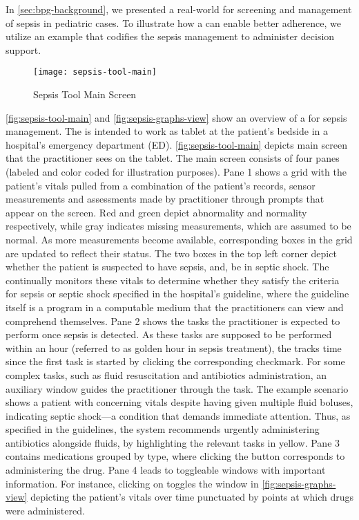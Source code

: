 In \autoref{sec:bpg-background}, we presented a real-world
\BPG{} for screening and management of sepsis in pediatric cases.
To illustrate how a \CDSSs{} can enable better \BPG{} adherence,
we utilize an example \CDSS{} that codifies the sepsis management \BPG{}
to administer decision support.

\begin{figure}[t!]
  \centering
  \texttt{[image: sepsis-tool-main]}
  \caption{Sepsis Tool Main Screen}\label{fig:sepsis-tool-main}
\end{figure}

\autoref{fig:sepsis-tool-main} and \autoref{fig:sepsis-graphs-view} show an overview
of a \CDSS{} for sepsis management.
The \CDSS{} is intended to work as tablet at
the patient's bedside in a hospital's emergency department (ED).
\autoref{fig:sepsis-tool-main} depicts main screen that the practitioner sees on the tablet.
The main screen consists of four panes (labeled and color coded for illustration
purposes). Pane 1 shows a grid with the patient's vitals pulled
from a combination of the patient's records, sensor measurements and
assessments made by practitioner through prompts that appear on the screen.
Red and green depict abnormality and normality respectively, while gray
indicates missing measurements, which are assumed to be normal. As more
measurements become available, corresponding boxes in the grid are updated
to reflect their status. The two boxes in the top left corner depict whether
the patient is suspected to have sepsis, and, be in septic shock. The \CDSS{}
continually monitors these vitals to determine whether they satisfy the criteria
for sepsis or septic shock specified in the hospital's guideline, where the
guideline itself is a program in a computable medium that the practitioners
can view and comprehend themselves. Pane 2 shows the tasks the practitioner is expected to perform
once sepsis is detected. As these tasks are supposed to be performed within an
hour (referred to as golden hour in sepsis treatment), the \CDSS{} tracks time
since the first task is started by clicking the corresponding checkmark.
For some complex tasks, such as fluid resuscitation and antibiotics
administration, an auxiliary window guides the practitioner through the task. The
example scenario shows a patient with concerning vitals despite having
given multiple fluid boluses, indicating septic shock---a condition that
demands immediate attention. Thus, as specified in the guidelines, the system
recommends urgently administering antibiotics alongside fluids, by highlighting
the relevant tasks in yellow.
Pane 3 contains medications grouped by type, where clicking the
 button corresponds to administering the drug.
Pane 4 leads to toggleable windows with
important information. For instance, clicking on 
toggles the window in \autoref{fig:sepsis-graphs-view} depicting
the patient's vitals over time punctuated by points at which
drugs were administered.


